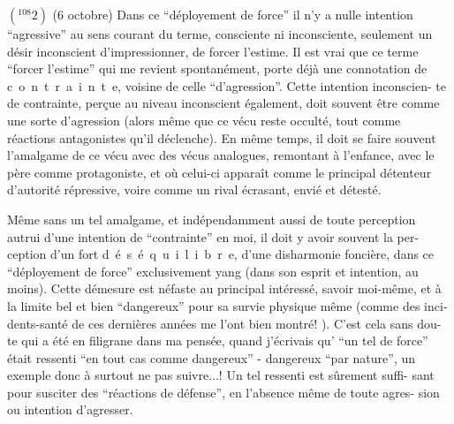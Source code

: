 \(({}^{108}2)\) (6 octobre) Dans ce ``déployement de force'' il n'y a nulle intention
``agressive'' au sens courant du terme, consciente ni inconsciente, seulement un
désir inconscient d'impressionner, de forcer l'estime. Il est vrai que ce terme
``forcer l'estime'' qui me revient spontanément, porte déjà une connotation de
\mbox{c o n t r a i n t e}, voisine de celle ``d'agression''. Cette intention inconscien-\linebreak
te de contrainte, perçue au niveau inconscient également, doit souvent être 
comme une sorte d'agression (alors même que ce vécu reste occulté, tout comme 
réactions antagonistes qu'il déclenche). En même temps, il doit se faire souvent
l'amalgame de ce vécu avec des vécus analogues, remontant à l'enfance, avec le
père comme protagoniste, et où celui-ci apparaît comme le principal détenteur
d'autorité répressive, voire comme un rival écrasant, envié et détesté.

Même sans un tel amalgame, et indépendamment aussi de toute perception 
autrui d'une intention de ``contrainte'' en moi, il doit y avoir souvent la per-\linebreak
ception d'un fort \mbox{d é s é q u i l i b r e}, d'une disharmonie foncière, dans
ce ``déployement de force'' exclusivement yang (dans son esprit et intention, au
moins). Cette démesure est néfaste au principal intéressé, savoir moi-même, et
à la limite bel et bien ``dangereux'' pour sa survie physique même (comme des inci-\linebreak
dents-santé de ces dernières années me l'ont bien montré! ). C'est cela sans dou-\linebreak
te qui a été en filigrane dans ma pensée, quand j'écrivais qu' ``un tel 
de force'' était ressenti ``en tout cas comme dangereux'' - dangereux ``par nature'',
un exemple donc à surtout ne pas suivre...! Un tel ressenti est sûrement suffi-\linebreak
sant pour susciter des ``réactions de défense'', en l'absence même de toute agres-\linebreak
sion ou intention d'agresser.

